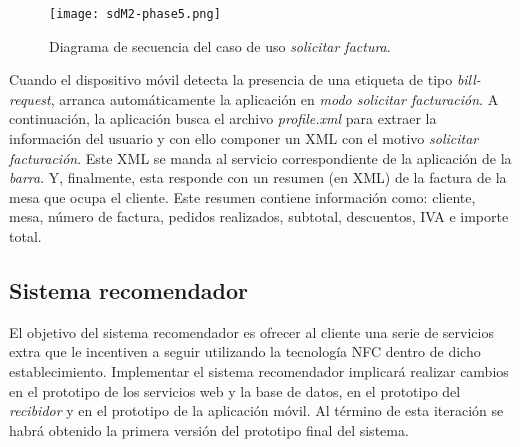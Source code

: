 \begin{itemize}
  \begin{sidewaysfigure}[h]
    \begin{center}
      \texttt{[image: sdM2-phase5.png]}
      \caption{Diagrama de secuencia del caso de uso \emph{solicitar factura}.}
      \label{fig:sdM2-phase5}
    \end{center}
  \end{sidewaysfigure}

Cuando el dispositivo móvil detecta la presencia de una etiqueta de tipo
\emph{bill-request}, arranca automáticamente la aplicación en \emph{modo
solicitar facturación}. A continuación, la aplicación busca el archivo
\emph{profile.xml} para extraer la información del usuario y con ello componer
un \acs{XML} con el motivo \emph{solicitar facturación}. Este \acs{XML} se
manda al servicio correspondiente de la aplicación de la \emph{barra}. Y,
finalmente, esta responde con un resumen (en \acs{XML}) de la factura de la 
mesa que ocupa el cliente. Este resumen contiene información como: cliente, 
mesa, número de factura, pedidos realizados, subtotal, descuentos, IVA e
importe total.
\end{itemize}


\subsection{Sistema recomendador}
El objetivo del sistema recomendador es ofrecer al cliente una serie de
servicios extra que le incentiven a seguir utilizando la tecnología \acs{NFC}
dentro de dicho establecimiento. Implementar el sistema recomendador implicará
realizar cambios en el prototipo de los servicios web y la base de datos, en
el prototipo del \emph{recibidor} y en el prototipo de la aplicación móvil.
Al término de esta iteración se habrá obtenido la primera versión del prototipo
final del sistema.

